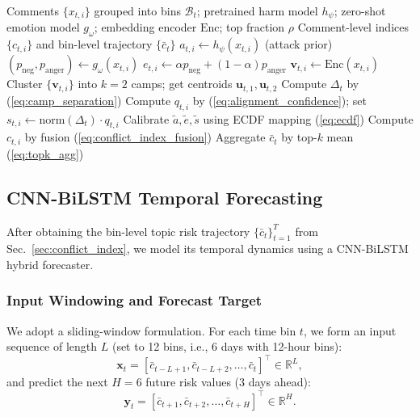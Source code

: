 \documentclass[journal]{IEEEtran}
\begin{document}
\begin{algorithm}[t]
\caption{Unsupervised Conflict Index Computation}\label{alg:conflict_index}
\begin{algorithmic}[1]
\REQUIRE Comments $\{x_{t,i}\}$ grouped into bins $\mathcal{B}_t$; pretrained harm model $h_\psi$; zero-shot emotion model $g_\omega$; embedding encoder $\mathrm{Enc}$; top fraction $\rho$
\ENSURE Comment-level indices $\{c_{t,i}\}$ and bin-level trajectory $\{\bar c_t\}$
    \STATE $a_{t,i}\leftarrow h_\psi(x_{t,i})$ \hfill (attack prior)
    \STATE $(p_{\text{neg}},p_{\text{anger}})\leftarrow g_\omega(x_{t,i})$
    \STATE $e_{t,i}\leftarrow \alpha p_{\text{neg}}+(1-\alpha)p_{\text{anger}}$
    \STATE $\mathbf{v}_{t,i}\leftarrow \mathrm{Enc}(x_{t,i})$
  \ENDFOR
  \STATE Cluster $\{\mathbf{v}_{t,i}\}$ into $k{=}2$ camps; get centroids $\mathbf{u}_{t,1},\mathbf{u}_{t,2}$
  \STATE Compute $\Delta_t$ by (\ref{eq:camp_separation})
    \STATE Compute $q_{t,i}$ by (\ref{eq:alignment_confidence}); set $s_{t,i}\leftarrow \mathrm{norm}(\Delta_t)\cdot q_{t,i}$
  \ENDFOR
\ENDFOR
\STATE Calibrate $\tilde{a},\tilde{e},\tilde{s}$ using ECDF mapping (\ref{eq:ecdf})
  \STATE Compute $c_{t,i}$ by fusion (\ref{eq:conflict_index_fusion})
\ENDFOR
{}
  \STATE Aggregate $\bar c_t$ by top-$k$ mean (\ref{eq:topk_agg})
\ENDFOR
\end{algorithmic}
\end{algorithm}

\subsection{CNN-BiLSTM Temporal Forecasting}\label{sec:lstm_forecast}

After obtaining the bin-level topic risk trajectory $\{\bar{c}_t\}_{t=1}^{T}$ from Sec.~\ref{sec:conflict_index}, we model its temporal dynamics using a CNN-BiLSTM hybrid forecaster.

\subsubsection{Input Windowing and Forecast Target}
We adopt a sliding-window formulation. For each time bin $t$, we form an input sequence of length $L$ (set to 12 bins, i.e., 6 days with 12-hour bins):
\begin{equation}
\mathbf{x}_t = [\bar{c}_{t-L+1},\bar{c}_{t-L+2},\dots,\bar{c}_{t}]^\top \in \mathbb{R}^{L},
\label{eq:lstm_input_window}
\end{equation}
and predict the next $H=6$ future risk values (3 days ahead):
\begin{equation}
\mathbf{y}_t = [\bar{c}_{t+1},\bar{c}_{t+2},\dots,\bar{c}_{t+H}]^\top \in \mathbb{R}^{H}.
\label{eq:lstm_target_window}
\end{equation}
\end{document}
